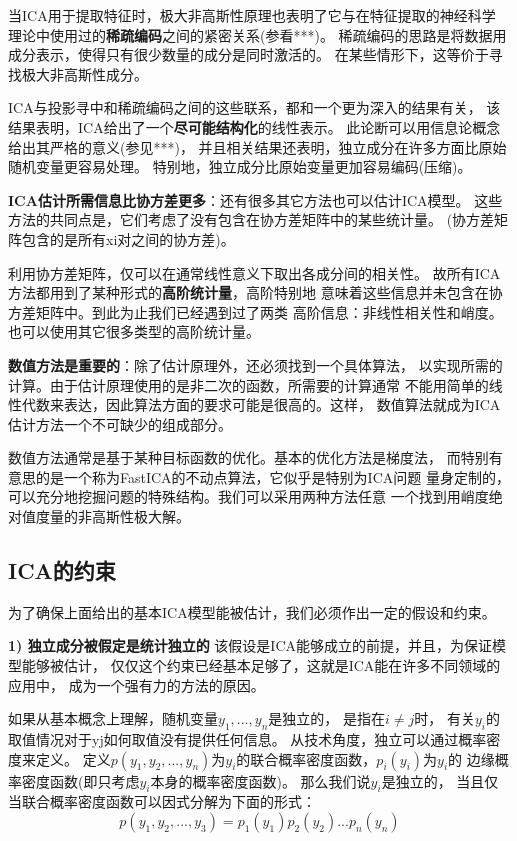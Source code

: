 当ICA用于提取特征时，极大非高斯性原理也表明了它与在特征提取的神经科学
理论中使用过的\textbf{稀疏编码}之间的紧密关系(参看***)。
稀疏编码的思路是将数据用成分表示，使得只有很少数量的成分是同时激活的。
在某些情形下，这等价于寻找极大非高斯性成分。

ICA与投影寻中和稀疏编码之间的这些联系，都和一个更为深入的结果有关，
该结果表明，ICA给出了一个\textbf{尽可能结构化}的线性表示。
此论断可以用信息论概念给出其严格的意义(参见***)，
并且相关结果还表明，独立成分在许多方面比原始随机变量更容易处理。
特别地，独立成分比原始变量更加容易编码(压缩)。
    
\textbf{ICA估计所需信息比协方差更多}：还有很多其它方法也可以估计ICA模型。
这些方法的共同点是，它们考虑了没有包含在协方差矩阵中的某些统计量。
(协方差矩阵包含的是所有xi对之间的协方差)。

利用协方差矩阵，仅可以在通常线性意义下取出各成分间的相关性。
故所有ICA方法都用到了某种形式的\textbf{高阶统计量}，高阶特别地
意味着这些信息并未包含在协方差矩阵中。到此为止我们已经遇到过了两类
高阶信息：非线性相关性和峭度。也可以使用其它很多类型的高阶统计量。
    
\textbf{数值方法是重要的}：除了估计原理外，还必须找到一个具体算法，
以实现所需的计算。由于估计原理使用的是非二次的函数，所需要的计算通常
不能用简单的线性代数来表达，因此算法方面的要求可能是很高的。这样，
数值算法就成为ICA估计方法一个不可缺少的组成部分。

数值方法通常是基于某种目标函数的优化。基本的优化方法是梯度法，
而特别有意思的是一个称为FastICA的不动点算法，它似乎是特别为ICA问题
量身定制的，可以充分地挖掘问题的特殊结构。我们可以采用两种方法任意
一个找到用峭度绝对值度量的非高斯性极大解。
    
\subsection{ICA的约束}
为了确保上面给出的基本ICA模型能被估计，我们必须作出一定的假设和约束。

\textbf{1) 独立成分被假定是统计独立的}
该假设是ICA能够成立的前提，并且，为保证模型能够被估计，
仅仅这个约束已经基本足够了，这就是ICA能在许多不同领域的应用中，
成为一个强有力的方法的原因。

如果从基本概念上理解，随机变量$y_1,...,y_n$是独立的，
是指在$i \ne j$时，
有关$y_i$的取值情况对于yj如何取值没有提供任何信息。
从技术角度，独立可以通过概率密度来定义。
定义$p(y_1,y_2,...,y_n)$为$y_i$的联合概率密度函数，$p_i(y_i)$为$y_i$的
边缘概率密度函数(即只考虑$y_i$本身的概率密度函数)。
那么我们说$y_i$是独立的，
当且仅当联合概率密度函数可以因式分解为下面的形式：
\begin{equation}
p(y_1, y_2, ..., y_3) = p_1(y_1)p_2(y_2)...p_n (y_n)
\end{equation}

